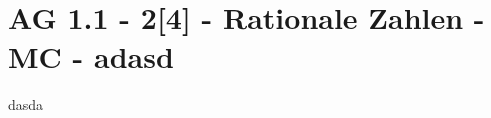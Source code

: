 \section{AG 1.1 - 2[4] - Rationale Zahlen - MC - adasd}

\begin{beispiel}[AG 1.1]{1}
dasda
\end{beispiel}